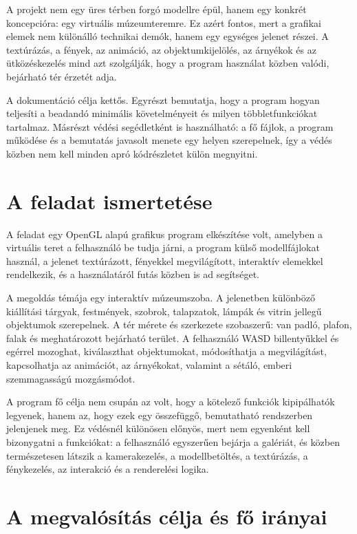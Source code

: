 \documentclass[12pt,a4paper]{article}
\begin{document}
A projekt nem egy üres térben forgó modellre épül, hanem egy konkrét koncepcióra: egy virtuális múzeumteremre. Ez azért fontos, mert a grafikai elemek nem különálló technikai demók, hanem egy egységes jelenet részei. A textúrázás, a fények, az animáció, az objektumkijelölés, az árnyékok és az ütközéskezelés mind azt szolgálják, hogy a program használat közben valódi, bejárható tér érzetét adja.

A dokumentáció célja kettős. Egyrészt bemutatja, hogy a program hogyan teljesíti a beadandó minimális követelményeit és milyen többletfunkciókat tartalmaz. Másrészt védési segédletként is használható: a fő fájlok, a program működése és a bemutatás javasolt menete egy helyen szerepelnek, így a védés közben nem kell minden apró kódrészletet külön megnyitni.

\section{A feladat ismertetése}

A feladat egy OpenGL alapú grafikus program elkészítése volt, amelyben a virtuális teret a felhasználó be tudja járni, a program külső modellfájlokat használ, a jelenet textúrázott, fényekkel megvilágított, interaktív elemekkel rendelkezik, és a használatáról futás közben is ad segítséget.

A megoldás témája egy interaktív múzeumszoba. A jelenetben különböző kiállítási tárgyak, festmények, szobrok, talapzatok, lámpák és vitrin jellegű objektumok szerepelnek. A tér mérete és szerkezete szobaszerű: van padló, plafon, falak és meghatározott bejárható terület. A felhasználó WASD billentyűkkel és egérrel mozoghat, kiválaszthat objektumokat, módosíthatja a megvilágítást, kapcsolhatja az animációt, az árnyékokat, valamint a sétáló, emberi szemmagasságú mozgásmódot.

A program fő célja nem csupán az volt, hogy a kötelező funkciók kipipálhatók legyenek, hanem az, hogy ezek egy összefüggő, bemutatható rendszerben jelenjenek meg. Ez védésnél különösen előnyös, mert nem egyenként kell bizonygatni a funkciókat: a felhasználó egyszerűen bejárja a galériát, és közben természetesen látszik a kamerakezelés, a modellbetöltés, a textúrázás, a fénykezelés, az interakció és a renderelési logika.

\section{A megvalósítás célja és fő irányai}
\end{document}
